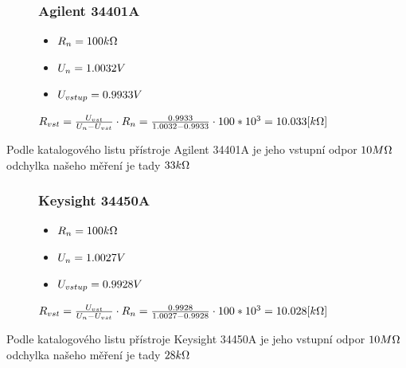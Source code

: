 \documentclass{article}
\begin{document}
\begin{figure}[H]
    \begin{minipage}[t]{0.3\textwidth}
        \subsubsection{Agilent 34401A}
        \begin{itemize}
            \item \(R_n = 100\-k\Omega\) 
            \item \(U_n = 1.0032\-V\) 
            \item \(U_{vstup} = 0.9933\-V\) 
        \end{itemize}
    \end{minipage}
    \hfill
    \begin{minipage}[t]{0.7\textwidth}
        \vspace{10mm}
        \(
            R_{vst} = \frac{U_{vst}}{U_{n}-U_{vst}}\cdot R_n = \frac{0.9933}{1.0032-0.9933}\cdot 100*10^3 = 10.033\-[k\Omega]  
        \)
    \end{minipage}
\end{figure}
Podle katalogového listu přístroje Agilent 34401A je jeho vstupní odpor \(10\-M\Omega \)\\odchylka našeho měření je tady \(33\-k\Omega\)

\begin{figure}[H]
    \begin{minipage}[t]{0.3\textwidth}
        \subsubsection{Keysight 34450A}
        \begin{itemize}
            \item \(R_n = 100\-k\Omega\) 
            \item \(U_n = 1.0027\-V\) 
            \item \(U_{vstup} = 0.9928\-V\) 
        \end{itemize}
    \end{minipage}
    \hfill
    \begin{minipage}[t]{0.7\textwidth}
        \vspace{10mm}
        \(
            R_{vst} = \frac{U_{vst}}{U_{n}-U_{vst}}\cdot R_n = \frac{0.9928}{1.0027-0.9928}\cdot 100*10^3 = 10.028\-[k\Omega]  
        \)
    \end{minipage}
\end{figure}
Podle katalogového listu přístroje Keysight 34450A je jeho vstupní odpor \(10\-M\Omega \)\\odchylka našeho měření je tady \(28\-k\Omega\)
\end{document}
